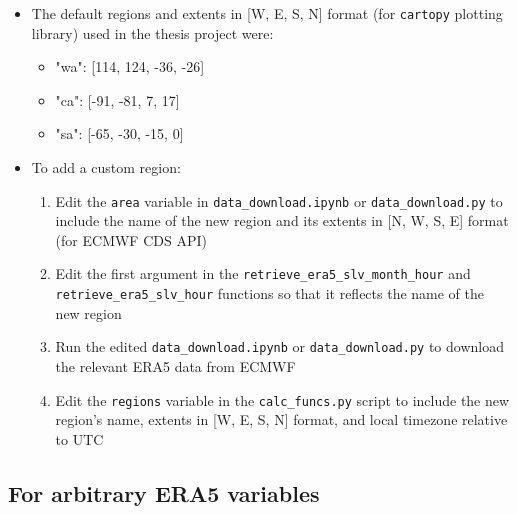 \begin{itemize}
	\item The default regions and extents in [W, E, S, N] format (for \verb+cartopy+ plotting library) used in the thesis project were: 
	\begin{itemize}
		\item "wa": [114, 124, -36, -26]
		\item "ca": [-91, -81, 7, 17]
		\item "sa": [-65, -30, -15, 0]
	\end{itemize}
	\item To add a custom region:
	\begin{enumerate}
		\item Edit the \verb+area+ variable in \verb+data_download.ipynb+ or \verb+data_download.py+ to include the name of the new region and its extents in [N, W, S, E] format (for \ac{ECMWF} \ac{CDS} API)
		\item Edit the first argument in the \verb+retrieve_era5_slv_month_hour+ and \\ \verb+retrieve_era5_slv_hour+ functions so that it reflects the name of the new region
		\item Run the edited \verb+data_download.ipynb+ or \verb+data_download.py+ to download the relevant \ac{ERA5} data from \ac{ECMWF}
		\item Edit the \verb+regions+ variable in the \verb+calc_funcs.py+ script to include the new region's name, extents in [W, E, S, N] format, and local timezone relative to UTC
	\end{enumerate}
\end{itemize}

\subsection{For arbitrary ERA5 variables}

